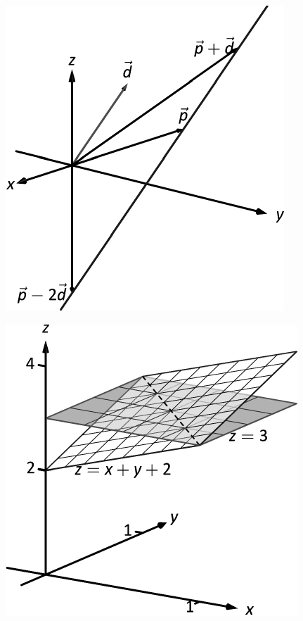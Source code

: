 \documentclass[10pt]{article}
\begin{document}
\includegraphics{figlines_intro_3DBW.pdf}
\texttt{}

\includegraphics{figmass2_3DBW.pdf}
\texttt{}
\end{document}
